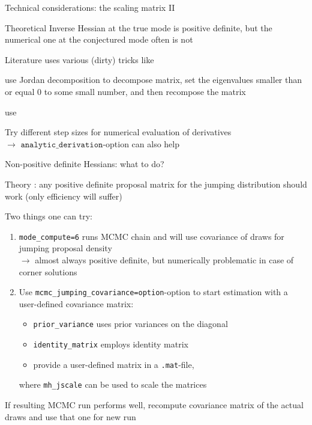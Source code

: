 \begin{frame}{Technical considerations: the scaling matrix II}
\begin{witemize}
    \item Theoretical Inverse Hessian at the true mode is positive definite, but the numerical one at the conjectured mode often is not
    \item Literature uses various (dirty) tricks like
    \begin{witemize}
      \item use Jordan decomposition to decompose matrix, set the eigenvalues smaller than or equal 0 to some small number, and then recompose the matrix
      \item use  \parencite[see e.g.][]{GillKing2004}
      \item Try different step sizes for numerical evaluation of derivatives \parencite{AnSchorfheide2007}\\
      $\rightarrow$ $\texttt{analytic\_derivation}$-option can also help
    \end{witemize}
\end{witemize}
\end{frame}

\begin{frame}{Non-positive definite Hessians: what to do?}
\begin{witemize}
  \item Theory \parencite[e.g.][]{ChibGreenberg1995}: any positive definite proposal matrix for the jumping distribution should work (only efficiency will suffer)
  \item Two things one can try:
  \begin{enumerate}
    \item \texttt{mode\_compute=6} runs MCMC chain and will use covariance of draws for jumping proposal density\\
    $\rightarrow$ almost always positive definite, but numerically problematic in case of corner solutions\vspace{0.15cm}
    \item Use \texttt{mcmc\_jumping\_covariance=option}-option to start estimation with a user-defined covariance matrix:
        \begin{itemize}
          \item \texttt{prior\_variance} uses prior variances on the diagonal
          \item \texttt{identity\_matrix} employs identity matrix
          \item provide a user-defined matrix in a \texttt{.mat}-file,
        \end{itemize}
        where \texttt{mh\_jscale} can be used to scale the matrices
  \end{enumerate}
  \item If resulting MCMC run performs well, recompute covariance matrix of the actual draws and use that one for new run
  \end{witemize}
\end{frame}

